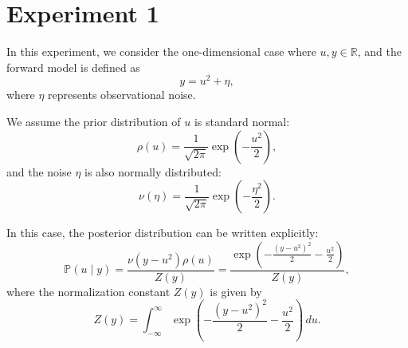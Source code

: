\documentclass[twoside,11pt]{article}
\begin{document}
\newpage
\section{Experiment 1}

In this experiment, we consider the one-dimensional case where \( u, y \in \mathbb{R} \), and the forward model is defined as
\[
    y = u^2 + \eta,
\]
where \(\eta\) represents observational noise.

We assume the prior distribution of \(u\) is standard normal:
\[
    \rho(u) = \frac{1}{\sqrt{2\pi}} \exp\left(-\frac{u^2}{2}\right),
\]
and the noise \(\eta\) is also normally distributed:
\[
    \nu(\eta) = \frac{1}{\sqrt{2\pi}} \exp\left(-\frac{\eta^2}{2}\right).
\]

In this case, the posterior distribution can be written explicitly:
\[
    \mathbb{P}(u \mid y) = \frac{\nu(y - u^2) \rho(u)}{Z(y)} 
    = \frac{\exp\left(-\frac{(y - u^2)^2}{2} - \frac{u^2}{2} \right)}{Z(y)},
\]
where the normalization constant \( Z(y) \) is given by
\[
    Z(y) = \int_{-\infty}^{\infty} \exp\left( -\frac{(y - u^2)^2}{2} - \frac{u^2}{2} \right) \, du.
\]


































\end{document}
